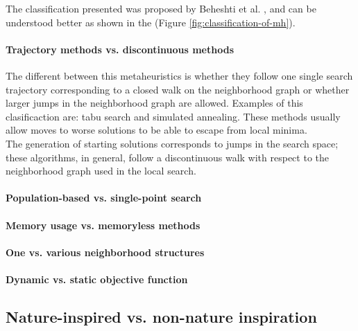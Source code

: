 The classification presented was proposed by Beheshti et al. \cite{Beheshti:2014:CCA:2563733.2564085}, and can be understood better as shown in the (Figure \ref{fig:classification-of-mh}).

\paragraph{Trajectory methods vs. discontinuous methods}
The different between this metaheuristics is whether they follow one single search trajectory
corresponding to a closed walk on the neighborhood graph or whether larger
jumps in the neighborhood graph are allowed. Examples of this clasificaction are: tabu search and simulated annealing. These methods usually allow moves to worse solutions to be able to escape from local minima.\\

The generation of starting solutions corresponds to jumps in the search space; these algorithms, in general, follow a discontinuous walk with respect to the neighborhood graph used in the local
search.
\paragraph{Population-based vs. single-point search}

\paragraph{Memory usage vs. memoryless methods}

\paragraph{One vs. various neighborhood structures}

\paragraph{Dynamic vs. static objective function}

\subsection{Nature-inspired vs. non-nature inspiration }


